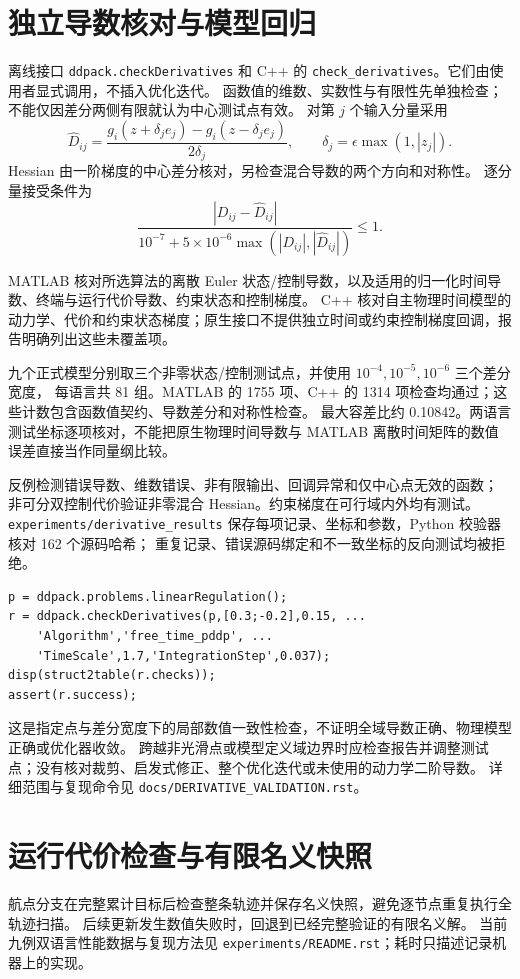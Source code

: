 \documentclass[UTF8,zihao=-4,openany,fontset=fandol]{ctexbook}
\newcommand{\code}[1]{\nolinkurl{#1}}
\begin{document}
\section{独立导数核对与模型回归}

离线接口 \code{ddpack.checkDerivatives} 和 C++ 的
\code{check_derivatives}。它们由使用者显式调用，不插入优化迭代。
函数值的维数、实数性与有限性先单独检查；不能仅因差分两侧有限就认为中心测试点有效。
对第 $j$ 个输入分量采用
\[
 \widehat D_{ij}=\frac{g_i(z+\delta_j e_j)-g_i(z-\delta_j e_j)}{2\delta_j},
 \qquad \delta_j=\epsilon\max(1,|z_j|).
\]
Hessian 由一阶梯度的中心差分核对，另检查混合导数的两个方向和对称性。
逐分量接受条件为
\[
 \frac{|D_{ij}-\widehat D_{ij}|}
 {10^{-7}+5\times10^{-6}\max(|D_{ij}|,|\widehat D_{ij}|)}\le1.
\]

MATLAB 核对所选算法的离散 Euler 状态/控制导数，以及适用的归一化时间导数、终端与运行代价导数、约束状态和控制梯度。
C++ 核对自主物理时间模型的动力学、代价和约束状态梯度；原生接口不提供独立时间或约束控制梯度回调，报告明确列出这些未覆盖项。

九个正式模型分别取三个非零状态/控制测试点，并使用 $10^{-4},10^{-5},10^{-6}$ 三个差分宽度，
每语言共 81 组。MATLAB 的 1755 项、C++ 的 1314 项检查均通过；这些计数包含函数值契约、导数差分和对称性检查。
最大容差比约 0.10842。两语言测试坐标逐项核对，不能把原生物理时间导数与 MATLAB 离散时间矩阵的数值误差直接当作同量纲比较。

反例检测错误导数、维数错误、非有限输出、回调异常和仅中心点无效的函数；
非可分双控制代价验证非零混合 Hessian。约束梯度在可行域内外均有测试。
\code{experiments/derivative_results} 保存每项记录、坐标和参数，Python 校验器核对 162 个源码哈希；
重复记录、错误源码绑定和不一致坐标的反向测试均被拒绝。

\begin{lstlisting}
p = ddpack.problems.linearRegulation();
r = ddpack.checkDerivatives(p,[0.3;-0.2],0.15, ...
    'Algorithm','free_time_pddp', ...
    'TimeScale',1.7,'IntegrationStep',0.037);
disp(struct2table(r.checks));
assert(r.success);
\end{lstlisting}

这是指定点与差分宽度下的局部数值一致性检查，不证明全域导数正确、物理模型正确或优化器收敛。
跨越非光滑点或模型定义域边界时应检查报告并调整测试点；没有核对裁剪、启发式修正、整个优化迭代或未使用的动力学二阶导数。
详细范围与复现命令见 \code{docs/DERIVATIVE_VALIDATION.rst}。

\section{运行代价检查与有限名义快照}
航点分支在完整累计目标后检查整条轨迹并保存名义快照，避免逐节点重复执行全轨迹扫描。
后续更新发生数值失败时，回退到已经完整验证的有限名义解。
当前九例双语言性能数据与复现方法见 \code{experiments/README.rst}；耗时只描述记录机器上的实现。
\end{document}

